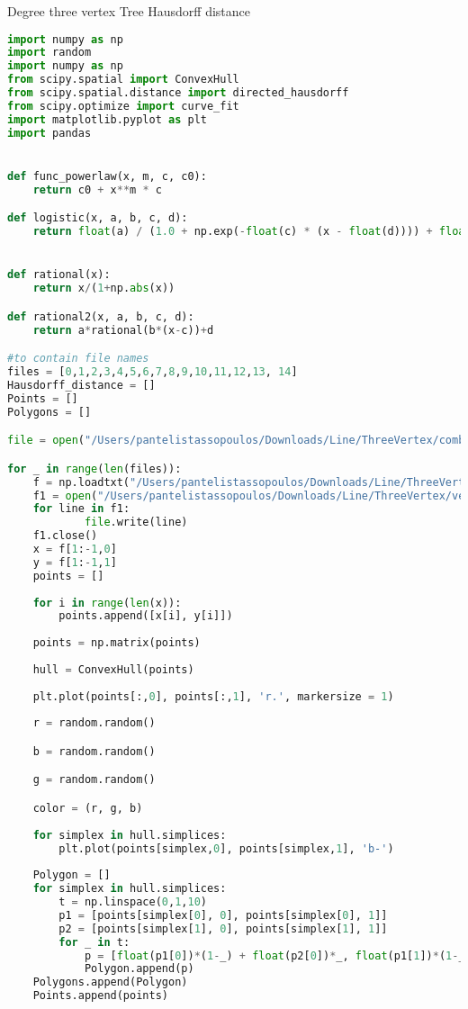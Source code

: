 \documentclass{article}
\begin{document}
\begin{codeblock}{Degree three vertex Tree Hausdorff distance}
\begin{lstlisting}[language=Python]
import numpy as np
import random
import numpy as np
from scipy.spatial import ConvexHull
from scipy.spatial.distance import directed_hausdorff
from scipy.optimize import curve_fit
import matplotlib.pyplot as plt
import pandas


def func_powerlaw(x, m, c, c0):
    return c0 + x**m * c

def logistic(x, a, b, c, d):
    return float(a) / (1.0 + np.exp(-float(c) * (x - float(d)))) + float(b)


def rational(x):
    return x/(1+np.abs(x))

def rational2(x, a, b, c, d):
    return a*rational(b*(x-c))+d

#to contain file names
files = [0,1,2,3,4,5,6,7,8,9,10,11,12,13, 14]
Hausdorff_distance = [] 
Points = []
Polygons = []

file = open("/Users/pantelistassopoulos/Downloads/Line/ThreeVertex/combined.txt", "w")

for _ in range(len(files)):
    f = np.loadtxt("/Users/pantelistassopoulos/Downloads/Line/ThreeVertex/verticeszThreeVertexDepth"+str(files[_])+".txt", usecols =(0,1), dtype = str)
    f1 = open("/Users/pantelistassopoulos/Downloads/Line/ThreeVertex/verticeszThreeVertexDepth"+str(files[_])+".txt", 'r')
    for line in f1:
            file.write(line)
    f1.close()
    x = f[1:-1,0]
    y = f[1:-1,1]
    points = []
                   
    for i in range(len(x)):
        points.append([x[i], y[i]])
                   
    points = np.matrix(points)  
                   
    hull = ConvexHull(points)
                   
    plt.plot(points[:,0], points[:,1], 'r.', markersize = 1)
    
    r = random.random()

    b = random.random()

    g = random.random()

    color = (r, g, b)
                   
    for simplex in hull.simplices:
        plt.plot(points[simplex,0], points[simplex,1], 'b-')
    
    Polygon = []
    for simplex in hull.simplices:
        t = np.linspace(0,1,10)
        p1 = [points[simplex[0], 0], points[simplex[0], 1]]
        p2 = [points[simplex[1], 0], points[simplex[1], 1]]
        for _ in t:
            p = [float(p1[0])*(1-_) + float(p2[0])*_, float(p1[1])*(1-_) + float(p2[1])*_]
            Polygon.append(p)
    Polygons.append(Polygon)
    Points.append(points)
    

\end{lstlisting}
\end{codeblock}
\end{document}
